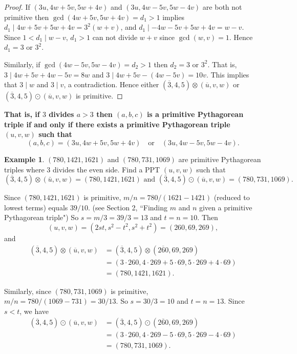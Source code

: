 \documentclass{article}
\theoremstyle{definition}
\newtheorem{example}{Example}[section]
\begin{document}
\begin{proof}
If \((3u, 4w+5v, 5w+4v)\) and \((3u, 4w-5v, 5w-4v)\) are both not primitive then \(\gcd(4w+5v, 5w+4v) = d_1>1\) implies \(d_1\mid 4w+5v+5w+4v = 3^2(w+v)\), and \(d_1\mid -4w-5v+5w+4v = w-v\). Since \(1<d_1\mid w-v\), \(d_1>1\) can not divide \(w+v\) since \(\gcd(w,v)=1\). Hence \(d_1=3\) or \(3^2\).

Similarly, if \(\gcd(4w-5v, 5w-4v) = d_2>1\) then \(d_2=3\) or \(3^2\). That is, \(3\mid 4w+5v+4w-5v = 8w\) and \(3\mid 4w+5v-(4w-5v) = 10v\). This implies that \(3\mid w\) and \(3\mid v\), a contradiction. Hence either \((\overline{3},4,5)\otimes(\overline{u},v,w)\) or  \((\overline{3},4,5)\odot(\overline{u},v,w)\) is primitive.
\end{proof}

\textbf{That is, if \({3}\) divides \(a>3\) then \((a,b,c)\) is a primitive Pythagorean triple if and only if there exists a primitive Pythagorean triple \((u,v,w)\) such that} \[(a,b,c) = (3u, 4w+5v, 5w+4v) \quad\text{or}\quad (3u, 4w-5v, 5w-4v).\]

\begin{example}
\((780,1421,1621)\) and \((780,731,1069)\) are primitive Pythagorean triples where 3 divides the even side. Find a PPT \((u,v,w)\) such that \[ (\overline{3},4,5) \otimes (\bar{u},v,w)=(780,1421,1621) \text{ and } (\bar{3},4,5) \odot (\overline{u},v,w)=(780,731,1069). \]

Since \((780,1421,1621)\) is primitive,  \(m/n=780/(1621-1421)\) (reduced to lowest terms) equals \(39/10\). (see Section 2, ``Finding \(m\) and \(n\) given a primitive Pythagorean triple") So \(s=m/3=39/3 = 13\) and \(t=n=10\). Then \[ (u,v,w) = (2st,s^2-t^2,s^2+t^2) =(260,69,269), \] and \[ \begin{aligned}
(\overline{3},4,5) \otimes (\overline{u},v,w) &= (\overline{3},4,5) \otimes (\overline{260},69,269) \\ &= (3\cdot 260,4\cdot 269+5\cdot 69, 5\cdot 269+4\cdot 69) \\
&= (780,1421,1621).
\end{aligned}\]

Similarly, since \((780,731,1069)\) is primitive, \(m/n=780/(1069-731)=30/13\). So \(s=30/3=10\) and \(t=n=13\). Since \(s<t\), we have \[ \begin{aligned}
(\overline{3},4,5) \odot (\overline{u},v,w) &= (\overline{3},4,5) \odot (\overline{260},69,269) \\
&= (3\cdot 260,4\cdot 269-5\cdot 69, 5\cdot 269-4\cdot 69) \\
&=(780,731,1069).
\end{aligned}\]
\end{example}
\end{document}
